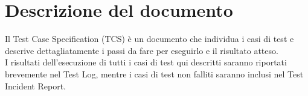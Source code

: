 \chapter{Descrizione del documento}
Il Test Case Specification (TCS) è un documento che individua i casi di test e descrive dettagliatamente i passi da fare per eseguirlo e il risultato atteso.\\
I risultati dell'esecuzione di tutti i casi di test qui descritti saranno riportati brevemente nel Test Log, mentre i casi di test non falliti saranno inclusi nel Test Incident Report.